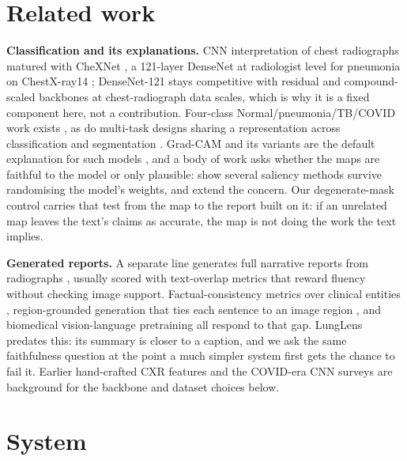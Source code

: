 \documentclass{article}
\begin{document}
\section{Related work}
\label{sec:related}

\textbf{Classification and its explanations.} CNN interpretation of chest radiographs matured with CheXNet \citep{rajpurkar2017chexnet}, a 121-layer DenseNet at radiologist level for pneumonia on ChestX-ray14 \citep{wang2017chestxray8}; DenseNet-121 \citep{huang2017densenet} stays competitive with residual \citep{he2016resnet} and compound-scaled \citep{tan2019efficientnet} backbones at chest-radiograph data scales, which is why it is a fixed component here, not a contribution. Four-class Normal/pneumonia/TB/COVID work exists \citep{chowdhury2020ai,kc2021evaluation}, as do multi-task designs sharing a representation across classification and segmentation \citep{gundel2019multitask}. Grad-CAM \citep{selvaraju2017gradcam} and its variants \citep{chattopadhay2018gradcampp} are the default explanation for such models \citep{singh2020explainable}, and a body of work asks whether the maps are faithful to the model or only plausible: \citet{adebayo2018sanitychecks} show several saliency methods survive randomising the model's weights, and \citet{kindermans2019reliability} extend the concern. Our degenerate-mask control carries that test from the map to the report built on it: if an unrelated map leaves the text's claims as accurate, the map is not doing the work the text implies.

\textbf{Generated reports.} A separate line generates full narrative reports from radiographs \citep{jing2018automatic,chen2020r2gen}, usually scored with text-overlap metrics that reward fluency without checking image support. Factual-consistency metrics over clinical entities \citep{miura2021factual}, region-grounded generation that ties each sentence to an image region \citep{tanida2023rgrg}, and biomedical vision-language pretraining \citep{bannur2023biovilt} all respond to that gap. LungLens predates this: its summary is closer to a caption, and we ask the same faithfulness question at the point a much simpler system first gets the chance to fail it. Earlier hand-crafted CXR features \citep{jaeger2014automatic,cortes1995svm,breiman2001randomforests} and the COVID-era CNN surveys \citep{sethy2020covid,wang2020covidnet,apostolopoulos2020covid,ozturk2020automated,minaee2020deepcovid} are background for the backbone and dataset choices below.

\section{System}
\label{sec:system}
\end{document}
